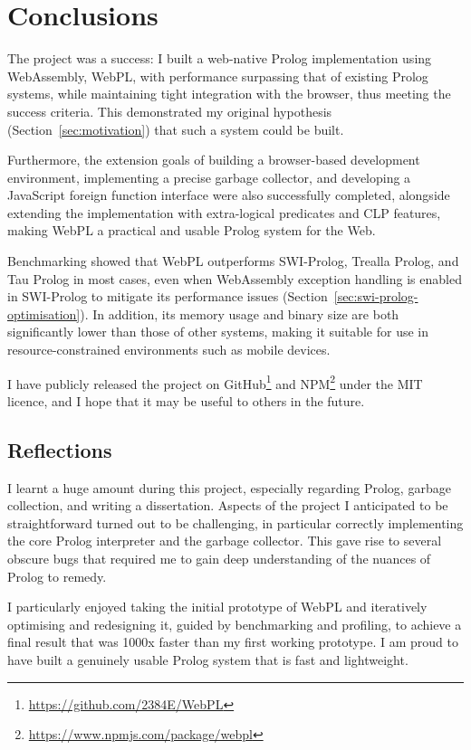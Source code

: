 \chapter{Conclusions}

The project was a success: I built a web-native Prolog implementation using WebAssembly, WebPL, with performance surpassing that of existing Prolog systems, while maintaining tight integration with the browser, thus meeting the success criteria. This demonstrated my original hypothesis (Section~\ref{sec:motivation}) that such a system could be built.

Furthermore, the extension goals of building a browser-based development environment, implementing a precise garbage collector, and developing a JavaScript foreign function interface were also successfully completed, alongside extending the implementation with extra-logical predicates and CLP features, making WebPL a practical and usable Prolog system for the Web.

Benchmarking showed that WebPL outperforms SWI-Prolog, Trealla Prolog, and Tau Prolog in most cases, even when WebAssembly exception handling is enabled in SWI-Prolog to mitigate its performance issues (Section~\ref{sec:swi-prolog-optimisation}). In addition, its memory usage and binary size are both significantly lower than those of other systems, making it suitable for use in resource-constrained environments such as mobile devices.

I have publicly released the project on GitHub\footnote{\url{https://github.com/2384E/WebPL}} and NPM\footnote{\url{https://www.npmjs.com/package/webpl}} under the MIT licence, and I hope that it may be useful to others in the future.

\section{Reflections}

I learnt a huge amount during this project, especially regarding Prolog, garbage collection, and writing a dissertation. Aspects of the project I anticipated to be straightforward turned out to be challenging, in particular correctly implementing the core Prolog interpreter and the garbage collector. This gave rise to several obscure bugs that required me to gain deep understanding of the nuances of Prolog to remedy.

I particularly enjoyed taking the initial prototype of WebPL and iteratively optimising and redesigning it, guided by benchmarking and profiling, to achieve a final result that was 1000x faster than my first working prototype. I am proud to have built a genuinely usable Prolog system that is fast and lightweight.

